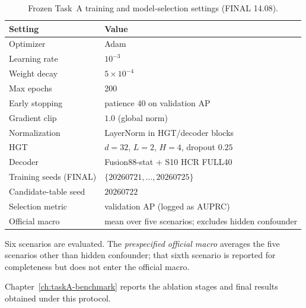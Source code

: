 \begin{table}[htbp]
\centering
\small
\caption{Frozen Task~A training and model-selection settings (FINAL 14.08).}
\label{tab:taskA-train}
\begin{tabular}{ll}
\toprule
Setting & Value \\
\midrule
Optimizer & Adam~\cite{kingma2015adam} \\
Learning rate & $10^{-3}$ \\
Weight decay & $5\times 10^{-4}$ \\
Max epochs & 200 \\
Early stopping & patience $40$ on validation AP \\
Gradient clip & $1.0$ (global norm) \\
Normalization & LayerNorm in HGT/decoder blocks~\cite{ba2016layernorm} \\
HGT & $d=32$, $L=2$, $H=4$, dropout $0.25$~\cite{hu2020hgt} \\
Decoder & Fusion88-stat + S10 HCR FULL40 \\
Training seeds (FINAL) & $\{20260721,\ldots,20260725\}$ \\
Candidate-table seed & $20260722$ \\
Selection metric & validation AP (logged as AUPRC) \\
Official macro & mean over five scenarios; excludes hidden confounder \\
\bottomrule
\end{tabular}
\end{table}

Six scenarios are evaluated.
The \emph{prespecified official macro} averages the five scenarios other than hidden confounder; that sixth scenario is reported for completeness but does not enter the official macro.

Chapter~\ref{ch:taskA-benchmark} reports the ablation stages and final results obtained under this protocol.
